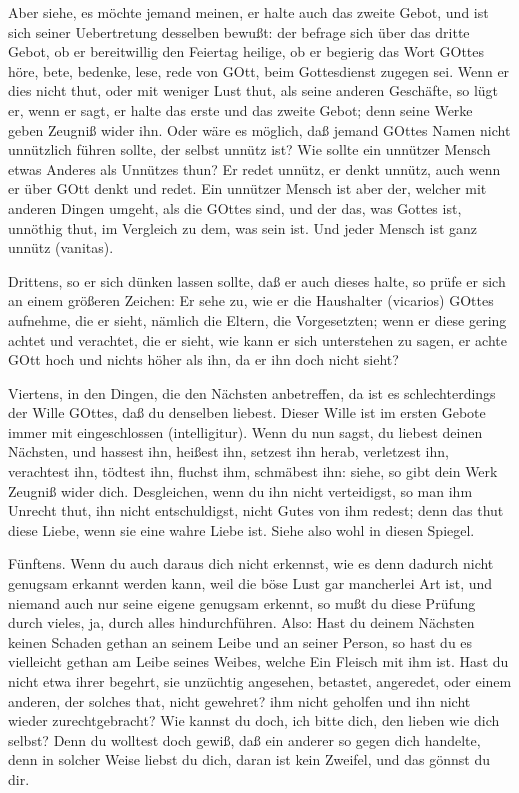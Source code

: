 Aber siehe, es möchte jemand meinen, er halte auch das zweite Gebot, und ist sich seiner Uebertretung desselben bewußt: der befrage sich über das dritte Gebot, ob er bereitwillig den Feiertag heilige, ob er begierig das Wort GOttes höre, bete, bedenke, lese, rede von GOtt, beim Gottesdienst zugegen sei. Wenn er dies nicht thut, oder mit weniger Lust thut, als seine anderen Geschäfte, so lügt er, wenn er sagt, er halte das erste und das zweite Gebot; denn seine Werke geben Zeugniß wider ihn. Oder wäre es möglich, daß jemand GOttes Namen nicht unnützlich führen sollte, der selbst unnütz ist? Wie sollte ein unnützer Mensch etwas Anderes als Unnützes thun? Er redet unnütz, er denkt unnütz, auch wenn er über GOtt denkt und redet. Ein unnützer Mensch ist aber der, welcher mit anderen Dingen umgeht, als die GOttes sind, und der das, was Gottes ist, unnöthig thut, im Vergleich zu dem, was sein ist. Und jeder Mensch ist ganz unnütz (vanitas).

Drittens, so er sich dünken lassen sollte, daß er auch dieses halte, so prüfe er sich an einem größeren Zeichen: Er sehe zu, wie er die Haushalter (vicarios) GOttes aufnehme, die er sieht, nämlich die Eltern, die Vorgesetzten; wenn er diese gering achtet und verachtet, die er sieht, wie kann er sich unterstehen zu sagen, er achte GOtt hoch und nichts höher als ihn, da er ihn doch nicht sieht?

Viertens, in den Dingen, die den Nächsten anbetreffen, da ist es schlechterdings der Wille GOttes, daß du denselben liebest. Dieser Wille ist im ersten Gebote immer mit eingeschlossen (intelligitur). Wenn du nun sagst, du liebest deinen Nächsten, und hassest ihn, heißest ihn, setzest ihn herab, verletzest ihn, verachtest ihn, tödtest ihn, fluchst ihm, schmäbest ihn: siehe, so gibt dein Werk Zeugniß wider dich. Desgleichen, wenn du ihn nicht verteidigst, so man ihm Unrecht thut, ihn nicht entschuldigst, nicht Gutes von ihm redest; denn das thut diese Liebe, wenn sie eine wahre Liebe ist. Siehe also wohl in diesen Spiegel.

Fünftens. Wenn du auch daraus dich nicht erkennst, wie es denn dadurch nicht genugsam erkannt werden kann, weil die böse Lust gar mancherlei Art ist, und niemand auch nur seine eigene genugsam erkennt, so mußt du diese Prüfung durch vieles, ja, durch alles hindurchführen. Also: Hast du deinem Nächsten keinen Schaden gethan an seinem Leibe und an seiner Person, so hast du es vielleicht gethan am Leibe seines Weibes, welche Ein Fleisch mit ihm ist. Hast du nicht etwa ihrer begehrt, sie unzüchtig angesehen, betastet, angeredet, oder einem anderen, der solches that, nicht gewehret? ihm nicht geholfen und ihn nicht wieder zurechtgebracht? Wie kannst du doch, ich bitte dich, den lieben wie dich selbst? Denn du wolltest doch gewiß, daß ein anderer so gegen dich handelte, denn in solcher Weise liebst du dich, daran ist kein Zweifel, und das gönnst du dir.

